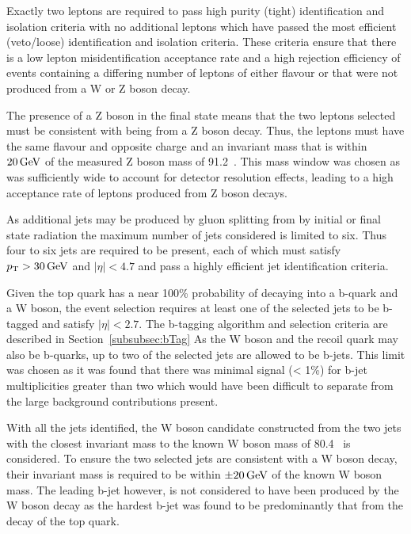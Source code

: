 Exactly two leptons are required to pass high purity (tight) identification and isolation criteria with no additional leptons which have passed the most efficient (veto/loose) identification and isolation criteria.
These criteria ensure that there is a low lepton misidentification acceptance rate and a high rejection efficiency of events containing a differing number of leptons of either flavour or that were not produced from a W or Z boson decay.

The presence of a Z boson in the final state means that the two leptons selected must be consistent with being from a Z boson decay.
Thus, the leptons must have the same flavour and opposite charge and an invariant mass that is within $20\,\text{Ge\hspace{-.08em}V}$ of the measured Z boson mass of 91.2\GeV~\cite{Tanabashi:2018oca}.
This mass window was chosen as was sufficiently wide to account for detector resolution effects, leading to a high acceptance rate of leptons produced from Z boson decays.

As additional jets may be produced by gluon splitting from by initial or final state radiation the maximum number of jets considered is limited to six.
Thus four to six jets are required to be present, each of which must satisfy $p_{\mathrm{T}} > 30\,\text{Ge\hspace{-.08em}V}$ and $|\eta| < 4.7$ and pass a highly efficient jet identification criteria.

Given the top quark has a near 100\% probability of decaying into a b-quark and a W boson, the event selection requires at least one of the selected jets to be b-tagged and satisfy $|\eta| < 2.7$.
The b-tagging algorithm and selection criteria are described in Section~\ref{subsubsec:bTag}
As the W boson and the recoil quark may also be b-quarks, up to two of the selected jets are allowed to be b-jets.
This limit was chosen as it was found that there was minimal signal (< 1\%) for b-jet multiplicities greater than two which would have been difficult to separate from the large background contributions present.  

With all the jets identified, the W boson candidate constructed from the two jets with the closest invariant mass to the known W boson mass of 80.4\GeVcc~\cite{Tanabashi:2018oca} is considered.
To ensure the two selected jets are consistent with a W boson decay, their invariant mass is required to be within $\pm 20\,\text{Ge\hspace{-.08em}V}$ of the known W boson mass.
The leading b-jet however, is not considered to have been produced by the W boson decay as the hardest b-jet was found to be predominantly that from the decay of the top quark.


